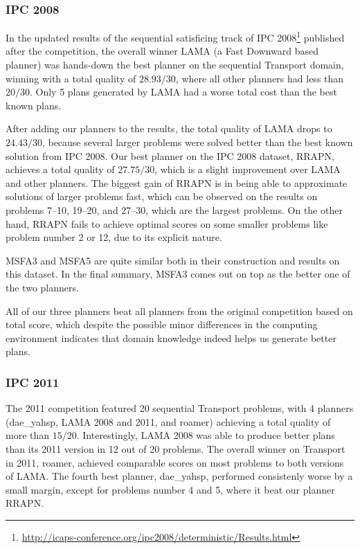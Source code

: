 \subsubsection{IPC 2008}

In the updated results of the sequential satisficing track of IPC 2008\footnote{\url{http://icaps-conference.org/ipc2008/deterministic/Results.html}} published after the competition,
the overall winner LAMA (a Fast Downward based planner)
was hands-down the best planner on the sequential Transport domain, winning
with a total quality of $28.93/30$, where all other planners had less than $20/30$.
Only 5 plans generated by LAMA had a worse total cost than the best known plans.

After adding our planners to the results,
the total quality of LAMA drops to $24.43/30$,
because several larger problems were solved better than the
best known solution from IPC 2008.
Our best planner on the IPC 2008 dataset, RRAPN, achieves a total quality of $27.75/30$,
which is a slight improvement over LAMA and other planners. The biggest gain of RRAPN is in being able to approximate
solutions of larger problems fast, which can be observed on
the results on problems 7--10, 19--20, and 27--30,
which are the largest problems.
On the other hand, RRAPN fails to achieve optimal scores
on some smaller problems like problem number 2 or 12,
due to its explicit nature.

MSFA3 and MSFA5 are quite similar both in their construction and results on this dataset.
In the final summary, MSFA3 comes out on top as the better one of the two planners.

All of our three planners beat all planners from the original competition based on total score,
which despite the possible minor differences in the computing environment indicates that
domain knowledge indeed helps us generate better plans.

\subsubsection{IPC 2011}

The 2011 competition featured 20 sequential Transport problems,
with 4 planners (dae\_yahsp, LAMA 2008 and 2011, and roamer) achieving a total quality of more than $15/20$.
Interestingly, LAMA 2008 was able to produce better plans than its 2011 version in 12 out of 20 problems. The overall winner on Transport in 2011, roamer, achieved comparable scores on most problems to both versions of LAMA. The fourth best planner, dae\_yahsp, performed consistenly worse by a small margin, except for problems number 4 and 5, where it beat our planner RRAPN.

